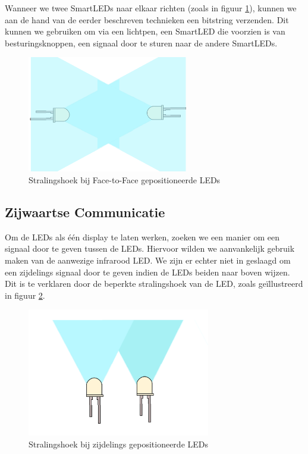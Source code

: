 \documentclass{article}
\begin{document}
Wanneer we twee SmartLEDs naar elkaar richten (zoals in figuur \ref{fig:plaatsingFace}), kunnen we aan de hand van de eerder beschreven technieken een bitstring verzenden. Dit kunnen we gebruiken om via een lichtpen, een SmartLED die voorzien is van besturingsknoppen, een signaal door te sturen naar de andere SmartLEDs. 

\begin{figure}[H]
\centering
\includegraphics[width=7cm]{LedTegenoverElkaar.png}
\caption{Stralingshoek bij Face-to-Face gepositioneerde LEDs}
\label{fig:plaatsingFace}
\end{figure}

\subsection{Zijwaartse Communicatie}
Om de LEDs als \'e\'en display te laten werken, zoeken we een manier om een signaal door te geven tussen de LEDs. Hiervoor wilden we aanvankelijk gebruik maken van de aanwezige infrarood LED. We zijn er echter niet in geslaagd om een zijdelings signaal door te geven indien de LEDs beiden naar boven wijzen. Dit is te verklaren door de beperkte stralingshoek van de LED, zoals ge\"illustreerd in figuur \ref{fig:plaatsing}.

\begin{figure}[H]
\centering
\includegraphics[width=8cm]{LedNaastElkaar.png}
\caption{Stralingshoek bij zijdelings gepositioneerde LEDs}
\label{fig:plaatsing}
\end{figure}
\end{document}
